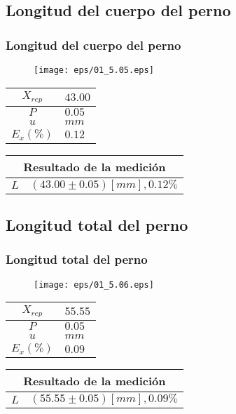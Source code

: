 \documentclass[letter,11pt]{beamer}
\begin{document}
\subsection{Longitud del cuerpo del perno}
\begin{frame}
\frametitle{Longitud del cuerpo del perno}
\vspace*{0.8cm}
\begin{figure}
\centering
\texttt{[image: eps/01\_5.05.eps]}
\end{figure}
\vspace*{0.4cm}
\scriptsize
\begin{tabular}{|c|>{\centering}m{1.8cm}<{\centering}|}
\hline
$X_{rep}$ &  $43.00$ \tabularnewline \hline
      $P$ &   $0.05$ \tabularnewline \hline
      $u$ &     $mm$ \tabularnewline \hline
$E_x(\%)$ &   $0.12$ \tabularnewline \hline
\end{tabular}
\quad
\begin{tabular}{|c|>{\centering}m{5.7cm}<{\centering}|}
\hline
\multicolumn{2}{|c|}{\textbf{Resultado de la medición}} \\ \hline
$L$ & $( 43.00\pm0.05)[mm], 0.12\%$ \tabularnewline \hline
\end{tabular}
\end{frame}

\subsection{Longitud total del perno}
\begin{frame}
\frametitle{Longitud total del perno}
\vspace*{0.8cm}
\begin{figure}
\centering
\texttt{[image: eps/01\_5.06.eps]}
\end{figure}
\vspace*{0.4cm}
\scriptsize
\begin{tabular}{|c|>{\centering}m{1.8cm}<{\centering}|}
\hline
$X_{rep}$ &  $55.55$ \tabularnewline \hline
      $P$ &   $0.05$ \tabularnewline \hline
      $u$ &     $mm$ \tabularnewline \hline
$E_x(\%)$ &   $0.09$ \tabularnewline \hline
\end{tabular}
\quad
\begin{tabular}{|c|>{\centering}m{5.7cm}<{\centering}|}
\hline
\multicolumn{2}{|c|}{\textbf{Resultado de la medición}} \\ \hline
$L$ & $( 55.55\pm0.05)[mm], 0.09\%$ \tabularnewline \hline
\end{tabular}
\end{frame}
\end{document}
